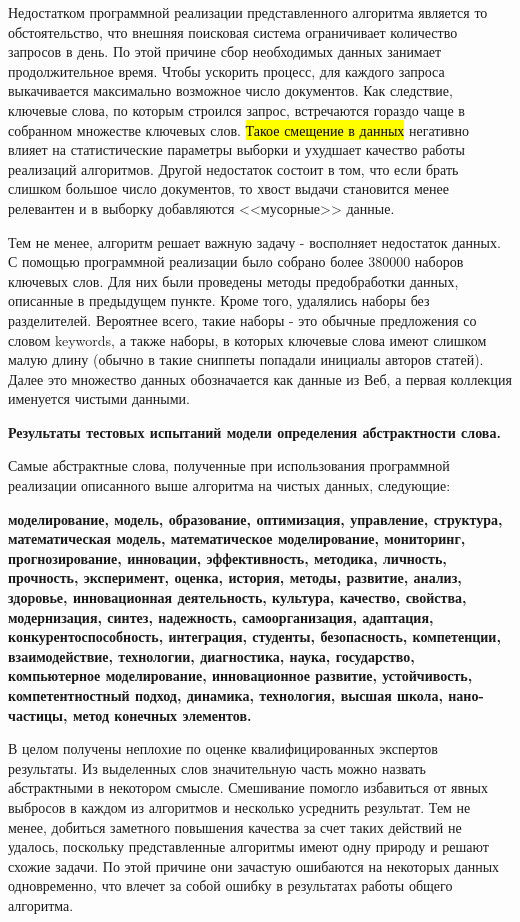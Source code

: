 Недостатком программной реализации представленного алгоритма является то обстоятельство, что внешняя поисковая система ограничивает количество запросов в день. По этой причине сбор необходимых данных занимает продолжительное время. Чтобы ускорить процесс, для каждого запроса выкачивается максимально возможное число документов. Как следствие, ключевые слова, по которым строился запрос, встречаются гораздо чаще в собранном множестве ключевых слов. \hl{Такое смещение в данных} негативно влияет на статистические параметры выборки и ухудшает качество работы реализаций алгоритмов. Другой недостаток состоит в том, что если брать слишком большое число документов, то хвост выдачи становится менее релевантен и в выборку добавляются <<мусорные>> данные.

Тем не менее, алгоритм решает важную задачу - восполняет недостаток данных. С помощью программной реализации было собрано более 380000 наборов ключевых слов. Для них были проведены методы предобработки данных, описанные в предыдущем пункте. Кроме того, удалялись наборы без разделителей. Вероятнее всего, такие наборы - это обычные предложения со словом keywords, а также наборы, в которых ключевые слова имеют слишком малую длину (обычно в такие сниппеты попадали инициалы авторов статей). Далее это множество данных обозначается как данные из Веб, а первая коллекция именуется чистыми данными.

\textbf{Результаты тестовых испытаний модели определения абстрактности слова.}

Самые абстрактные слова, полученные при использования программной реализации описанного выше алгоритма на чистых данных, следующие:

\textbf{моделирование, модель, образование, оптимизация, управление, структура, математическая модель, математическое моделирование, мониторинг, прогнозирование, инновации, эффективность, методика, личность, прочность, эксперимент, оценка, история, методы, развитие, анализ, здоровье, инновационная деятельность, культура, качество, свойства, модернизация, синтез, надежность, самоорганизация, адаптация, конкурентоспособность, интеграция, студенты, безопасность, компетенции, взаимодействие, технологии, диагностика, наука, государство, компьютерное моделирование, инновационное развитие, устойчивость, компетентностный подход, динамика, технология, высшая школа, нано-
частицы, метод конечных элементов.}

В целом получены неплохие по оценке квалифицированных экспертов результаты. Из выделенных слов значительную часть можно назвать абстрактными в некотором смысле. Смешивание помогло избавиться от явных выбросов в каждом из алгоритмов и несколько усреднить результат. Тем не менее, добиться заметного повышения качества за счет таких действий не удалось, поскольку представленные алгоритмы имеют одну природу и решают схожие задачи. По этой причине они зачастую ошибаются на некоторых данных одновременно, что влечет за собой ошибку в результатах работы общего алгоритма.

